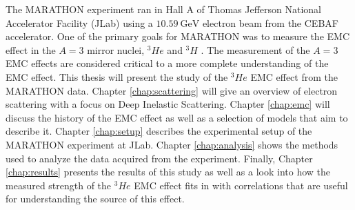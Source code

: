 The MARATHON experiment ran in Hall A of Thomas Jefferson National Accelerator Facility (JLab) using a $10.59\ \text{GeV}$ electron beam from the CEBAF accelerator. One of the primary goals for MARATHON was to measure the EMC effect in the $A=3$ mirror nuclei, $^3He$ and $^3H$ \cite{proposal}. The measurement of the $A=3$ EMC effects are considered critical to a more complete understanding of the EMC effect. This thesis will present the study of the $^3He$ EMC effect from the MARATHON data. Chapter \ref{chap:scattering} will give an overview of electron scattering with a focus on Deep Inelastic Scattering. Chapter \ref{chap:emc} will discuss the history of the EMC effect as well as a selection of models that aim to describe it. Chapter \ref{chap:setup} describes the experimental setup of the MARATHON experiment at JLab. Chapter \ref{chap:analysis} shows the methods used to analyze the data acquired from the experiment. Finally, Chapter \ref{chap:results} presents the results of this study as well as a look into how the measured strength of the $^3He$ EMC effect fits in with correlations that are useful for understanding the source of this effect.